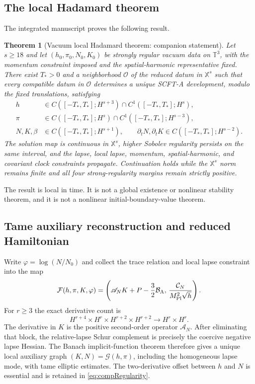 \documentclass[aps,prd,reprint,onecolumn,notitlepage,nofootinbib,longbibliography,floatfix]{revtex4-2}
\theoremstyle{scstyle}
\newtheorem{theorem}{Theorem}[section]
\theoremstyle{definition}
\theoremstyle{remark}
\newcommand{\mpl}{M_{\rm Pl}}
\newcommand{\cB}{\mathcal B}
\newcommand{\cC}{\mathcal C}
\newcommand{\AN}{\mathscr A_N}
\begin{document}
\subsection{The local Hadamard theorem}
The integrated manuscript proves the following result.
\begin{theorem}[Vacuum local Hadamard theorem: companion statement]
\label{thm:compHadamard}
Let $s\ge18$ and let $(h_0,\pi_0,N_0,K_0)$ be strongly regular vacuum data on $\mathbb T^3$, with the momentum constraint imposed and the spatial-harmonic representative fixed.  There exist $T_*>0$ and a neighborhood $\mathcal O$ of the reduced datum in $\mathbb X^s$ such that every compatible datum in $\mathcal O$ determines a unique SCFT-A development, modulo the fixed translations, satisfying
\begin{align}
 h&\in C([-T_*,T_*];H^{s+3})\cap C^1([-T_*,T_*];H^s),\nonumber\\
 \pi&\in C([-T_*,T_*];H^s)\cap C^1([-T_*,T_*];H^{s-3}),\label{eq:compRegularity}\\
 N,K,\beta&\in C([-T_*,T_*];H^{s+1}),\qquad
 \partial_tN,\partial_tK\in C([-T_*,T_*];H^{s-2}).\nonumber
\end{align}
The solution map is continuous in $\mathbb X^s$, higher Sobolev regularity persists on the same interval, and the lapse, local lapse, momentum, spatial-harmonic, and covariant clock constraints propagate.  Continuation holds while the $\mathbb X^s$ norm remains finite and all four strong-regularity margins remain strictly positive.
\end{theorem}
The result is local in time.  It is not a global existence or nonlinear stability theorem, and it is not a nonlinear initial-boundary-value theorem.

\subsection{Tame auxiliary reconstruction and reduced Hamiltonian}
Write $\varphi=\log(N/N_0)$ and collect the trace relation and local lapse constraint into the map
\begin{equation}
 \mathcal F(h,\pi,K,\varphi)=
 \left(\AN K+P-\frac32\cB_{\rm A},\,
       \frac{\cC_N}{\mpl^2\sqrt h}\right).
 \label{eq:compFmap}
\end{equation}
For $r\ge3$ the exact derivative count is
\begin{equation}
 H^{r+4}\times H^r\times H^{r+2}\times H^{r+2}
 \longrightarrow H^r\times H^r.
 \label{eq:compFspaces}
\end{equation}
The derivative in $K$ is the positive second-order operator $\AN$.  After eliminating that block, the relative-lapse Schur complement is precisely the coercive negative lapse Hessian.  The Banach implicit-function theorem therefore gives a unique local auxiliary graph $(K,N)=\mathcal G(h,\pi)$, including the homogeneous lapse mode, with tame elliptic estimates.  The two-derivative offset between $h$ and $N$ is essential and is retained in \cref{eq:compRegularity}.
\end{document}
